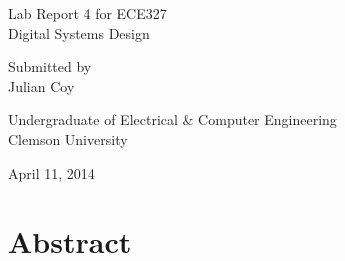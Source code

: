 \documentclass[11pt]{report}
\begin{document}
\begin{spacing}{1.5}

\thispagestyle{empty}

\begin{scshape}

\vspace*{30pt}
{
\Huge
\begin{center}
    \reporttitle
\end{center}
}
\vspace{30pt}

{
\Large
\begin{center}
  Lab Report 4 for ECE327 \\
  Digital Systems Design
\end{center}
}
\vspace{30pt}
{
\Large 
\begin{center}
  Submitted by \\
  Julian Coy
\end{center}
}
\vspace{120pt}

{
\Large
\begin{center}
  Undergraduate of Electrical \& Computer Engineering \\
  Clemson University
\end{center}
}
\vspace{30pt}

{
\Large
\begin{center}
  April 11, 2014
\end{center}
}

\end{scshape}

\clearpage


\vspace{15pt}
  \setcounter{chapter}{1}
  \chapter*{Abstract}
  \label{cha:abstract}
\vspace{72pt}


\end{spacing}
\end{document}
